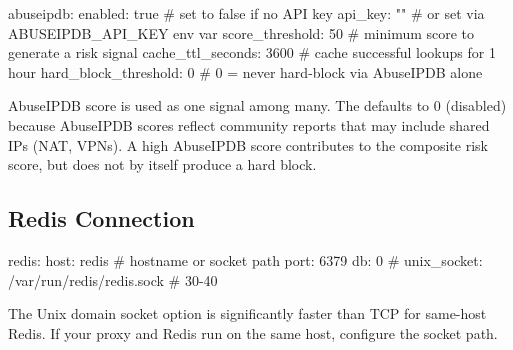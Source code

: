 \begin{yamlcode}
abuseipdb:
  enabled: true            # set to false if no API key
  api_key: ""              # or set via ABUSEIPDB_API_KEY env var
  score_threshold: 50      # minimum score to generate a risk signal
  cache_ttl_seconds: 3600  # cache successful lookups for 1 hour
  hard_block_threshold: 0  # 0 = never hard-block via AbuseIPDB alone
\end{yamlcode}

AbuseIPDB score is used as one signal among many. The 
defaults to 0 (disabled) because AbuseIPDB scores reflect community reports that may
include shared IPs (NAT, VPNs). A high AbuseIPDB score contributes to the composite
risk score, but does not by itself produce a hard block.

\subsection{Redis Connection}

\begin{yamlcode}
redis:
  host: redis              # hostname or socket path
  port: 6379
  db: 0
  # unix_socket: /var/run/redis/redis.sock  # 30-40%
\end{yamlcode}

The Unix domain socket option is significantly faster than TCP for same-host Redis.
If your proxy and Redis run on the same host, configure the socket path.
